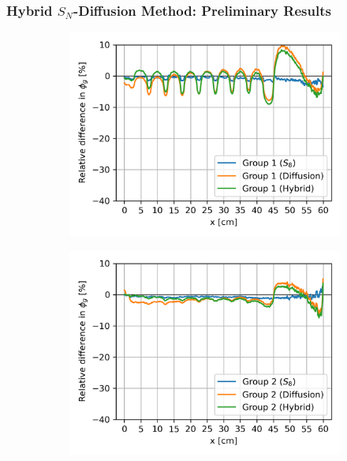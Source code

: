 \begin{frame}
  \frametitle{Hybrid $S_N$-Diffusion Method: Preliminary Results}
  \begin{figure}[htb!]
    \centering
    \begin{subfigure}[t]{.34\textwidth}
      \centering
      \includegraphics[width=\textwidth]{../images/case-5a-group-1-flux-error}
      \label{fig:c5ag1e}
    \end{subfigure}
    \begin{subfigure}[t]{.34\textwidth}
      \centering
      \includegraphics[width=\textwidth]{../images/case-5a-group-2-flux-error}
      \label{fig:c5ag2e}
    \end{subfigure}
    \begin{subfigure}[t]{.34\textwidth}

\end{subfigure}
\end{figure}
\end{frame}
